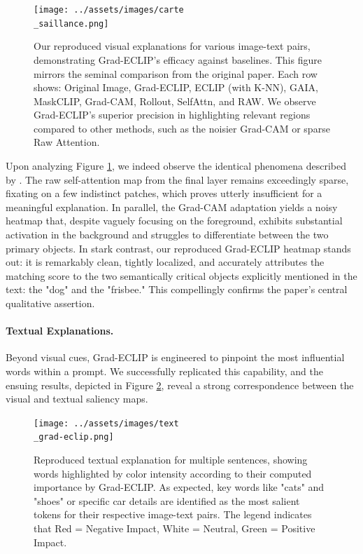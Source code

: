 \documentclass[10pt]{article} %
\begin{document}
\begin{figure}[h!]
\centering
\texttt{[image: ../assets/images/carte\\\_saillance.png]}
\caption{Our reproduced visual explanations for various image-text pairs, demonstrating Grad-ECLIP's efficacy against baselines. This figure mirrors the seminal comparison from the original paper. Each row shows: Original Image, Grad-ECLIP, ECLIP (with K-NN), GAIA, MaskCLIP, Grad-CAM, Rollout, SelfAttn, and RAW. We observe Grad-ECLIP's superior precision in highlighting relevant regions compared to other methods, such as the noisier Grad-CAM or sparse Raw Attention. }
\label{fig:qualitative_repro}
\end{figure}

Upon analyzing Figure \ref{fig:qualitative_repro}, we indeed observe the identical phenomena described by \citet{zhao2024grad}. The raw self-attention map from the final layer remains exceedingly sparse, fixating on a few indistinct patches, which proves utterly insufficient for a meaningful explanation. In parallel, the Grad-CAM adaptation yields a noisy heatmap that, despite vaguely focusing on the foreground, exhibits substantial activation in the background and struggles to differentiate between the two primary objects. In stark contrast, our reproduced Grad-ECLIP heatmap stands out: it is remarkably clean, tightly localized, and accurately attributes the matching score to the two semantically critical objects explicitly mentioned in the text: the "dog" and the "frisbee." This compellingly confirms the paper's central qualitative assertion.

\paragraph{Textual Explanations.}
Beyond visual cues, Grad-ECLIP is engineered to pinpoint the most influential words within a prompt. We successfully replicated this capability, and the ensuing results, depicted in Figure \ref{fig:textual_repro}, reveal a strong correspondence between the visual and textual saliency maps.

\begin{figure}[h!]
\centering
\texttt{[image: ../assets/images/text\\\_grad-eclip.png]}
\caption{Reproduced textual explanation for multiple sentences, showing words highlighted by color intensity according to their computed importance by Grad-ECLIP. As expected, key words like "cats" and "shoes" or specific car details are identified as the most salient tokens for their respective image-text pairs. The legend indicates that Red = Negative Impact, White = Neutral, Green = Positive Impact. }
\label{fig:textual_repro}
\end{figure}
\end{document}
